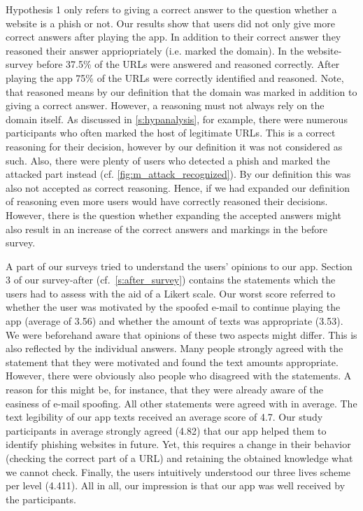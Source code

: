 \begin{description}[leftmargin=0cm]
	\item[Correct and Reasoned Answers] Hypothesis 1 only refers to giving a correct answer to the question whether a website is a phish or not.
	Our results show that users did not only give more correct answers after playing the app.
	In addition to their correct answer they reasoned their answer appriopriately (i.e. marked the domain).
	In the website-survey before 37.5\% of the URLs were answered and reasoned correctly.
	After playing the app 75\% of the URLs were correctly identified and reasoned. 
	Note, that reasoned means by our definition that the domain was marked in addition to giving a correct answer.
	However, a reasoning must not always rely on the domain itself. 
	As discussed in \autoref{s:hypanalysis}, for example, there were numerous participants who often marked the host of legitimate URLs.
	This is a correct reasoning for their decision, however by our definition it was not considered as such.
	Also, there were plenty of users who detected a phish and marked the attacked part instead (cf. \autoref{fig:m_attack_recognized}).
	By our definition this was also not accepted as correct reasoning.
	Hence, if we had expanded our definition of reasoning even more users would have correctly reasoned their decisions.
	However, there is the question whether expanding the accepted answers might also result in an increase of the correct answers and markings in the before survey.
	\item[User Opinions to App] A part of our surveys tried to understand the users' opinions to our app.
	Section 3 of our survey-after (cf.~\autoref{s:after_survey}) contains the statements which the users had to assess with the aid of a Likert scale.
	Our worst score referred to whether the user was motivated by the spoofed e-mail to continue playing the app (average of 3.56) and whether the amount of texts was appropriate (3.53).
	We were beforehand aware that opinions of these two aspects might differ.
	This is also reflected by the individual answers.
	Many people strongly agreed with the statement that they were motivated and found the text amounts appropriate.
	However, there were obviously also people who disagreed with the statements.
	A reason for this might be, for instance, that they were already aware of the easiness of e-mail spoofing.
	All other statements were agreed with in average.
	The text legibility of our app texts received an average score of 4.7.
	Our study participants in average strongly agreed (4.82) that our app helped them to identify phishing websites in future.
	Yet, this requires a change in their behavior (checking the correct part of a URL) and retaining the obtained knowledge what we cannot check.
	Finally, the users intuitively understood our three lives scheme per level (4.411).
	All in all, our impression is that our app was well received by the participants.

\end{description}

